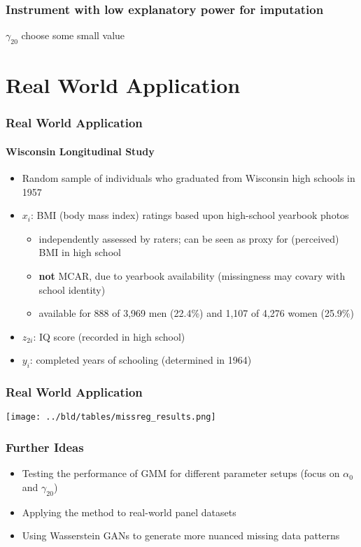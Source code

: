 \documentclass[aspectratio=1610]{beamer}
\begin{document}
\begin{frame}
	\frametitle{Instrument with low explanatory power for imputation}
	$\gamma_{20}$ choose some small value
\end{frame}
\begin{frame}
    
\end{frame}


\section{Real World Application}

\begin{frame}
	\frametitle{Real World Application}
	\framesubtitle{Wisconsin Longitudinal Study}
	\begin{itemize}
		\item<1-> Random sample of individuals who graduated from Wisconsin high schools in 1957

		\item<2-> $x_i$: BMI (body mass index) ratings based upon high-school yearbook photos
		\begin{itemize}
			\item<2-> independently assessed by raters; can be seen as proxy for (perceived) BMI in high school
			\item<2-> \textbf{not} MCAR, due to yearbook availability (missingness may covary with school identity)
			\item<2-> available for 888 of 3,969 men (22.4\%) and 1,107 of 4,276 women (25.9\%)
		\end{itemize}

		\item<3-> $z_{2i}$: IQ score (recorded in high school)

		\item<4-> $y_i$: completed years of schooling (determined in 1964)
	\end{itemize}
\end{frame}

\begin{frame}
	\frametitle{Real World Application}
	\center
    \texttt{[image: ../bld/tables/missreg\_results.png]}
\end{frame}

\begin{frame}
	\frametitle{Further Ideas}
	\begin{itemize}
		\item Testing the performance of GMM for different parameter setups (focus on $\alpha_0$ and $\gamma_{20}$)
		\item Applying the method to real-world panel datasets
		\item Using Wasserstein GANs to generate more nuanced missing data patterns
	\end{itemize}
\end{frame}
\end{document}
